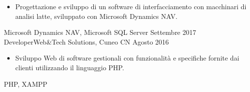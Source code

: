 \begin{experiences}
{\begin{itemize}
			\item Progettazione e sviluppo di un software di interfacciamento con macchinari di analisi latte, sviluppato con Microsoft Dynamics NAV.                     
		\end{itemize}
	}
	{Microsoft Dynamics NAV, Microsoft SQL Server}
	\emptySeparator
	\emptySeparator
	\experience
	{Settembre 2017}     {Developer}{Web\&Tech Solutions, Cuneo CN}
	{Agosto 2016}    {
		\begin{itemize}
			\item Sviluppo Web di software gestionali con funzionalità e specifiche fornite dai clienti utilizzando il linguaggio PHP.
		\end{itemize}
	}
	{PHP, XAMPP}
	\emptySeparator
	 
	
\end{experiences}
